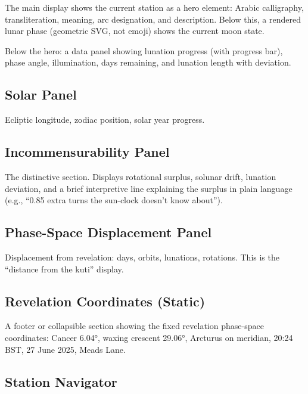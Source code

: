 The main display shows the current station as a hero element: Arabic calligraphy, transliteration, meaning, arc designation, and description. Below this, a rendered lunar phase (geometric SVG, not emoji) shows the current moon state.

Below the hero: a data panel showing lunation progress (with progress bar), phase angle, illumination, days remaining, and lunation length with deviation.

\hypertarget{solar-panel}{%
\subsection{Solar Panel}\label{solar-panel}}

Ecliptic longitude, zodiac position, solar year progress.

\hypertarget{incommensurability-panel}{%
\subsection{Incommensurability Panel}\label{incommensurability-panel}}

The distinctive section. Displays rotational surplus, solunar drift, lunation deviation, and a brief interpretive line explaining the surplus in plain language (e.g., ``0.85 extra turns the sun-clock doesn't know about'').

\hypertarget{phase-space-displacement-panel}{%
\subsection{Phase-Space Displacement Panel}\label{phase-space-displacement-panel}}

Displacement from revelation: days, orbits, lunations, rotations. This is the ``distance from the kuti'' display.

\hypertarget{revelation-coordinates-static}{%
\subsection{Revelation Coordinates (Static)}\label{revelation-coordinates-static}}

A footer or collapsible section showing the fixed revelation phase-space coordinates: Cancer 6.04°, waxing crescent 29.06°, Arcturus on meridian, 20:24 BST, 27 June 2025, Meads Lane.

\hypertarget{station-navigator}{%
\subsection{Station Navigator}\label{station-navigator}}

